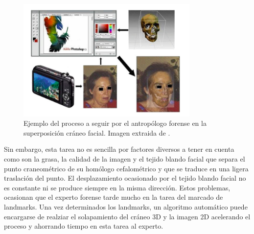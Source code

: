 \begin{figure}[!h]
    \centering
    \includegraphics[width=0.8\textwidth]{img/ejemplo_SCF_intro.png}
    \caption{Ejemplo del proceso a seguir por el antropólogo forense en la superposición cráneo facial. Imagen extraida de \cite{damas2020handbook}.}
\end{figure}

\medskip

\noindent Sin embargo, esta tarea no es sencilla por factores diversos a tener en cuenta como son la grasa, la calidad de la imagen y el tejido blando facial que separa el punto craneométrico de su homólogo cefalométrico y que se traduce en una ligera traslación del punto. El desplazamiento ocasionado por el tejido blando facial no es constante ni se produce siempre en la misma dirección. Estos problemas, ocasionan que el experto forense tarde mucho en la tarea del marcado de landmarks. Una vez determinados los landmarks, un algoritmo automático puede encargarse de realziar el solapamiento del cráneo 3D y la imagen 2D acelerando el proceso y ahorrando tiempo en esta tarea al experto.

